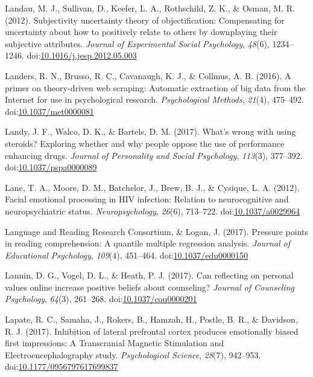 \documentclass[english,man]{apa6}
\theoremstyle{definition}
\theoremstyle{definition}
\theoremstyle{definition}
\theoremstyle{remark}
\begin{document}
\hypertarget{ref-Landau2012}{}
Landau, M. J., Sullivan, D., Keefer, L. A., Rothschild, Z. K., \& Osman,
M. R. (2012). Subjectivity uncertainty theory of objectification:
Compensating for uncertainty about how to positively relate to others by
downplaying their subjective attributes. \emph{Journal of Experimental
Social Psychology}, \emph{48}(6), 1234--1246.
doi:\href{https://doi.org/10.1016/j.jesp.2012.05.003}{10.1016/j.jesp.2012.05.003}

\hypertarget{ref-Landers2016}{}
Landers, R. N., Brusso, R. C., Cavanaugh, K. J., \& Collmus, A. B.
(2016). A primer on theory-driven web scraping: Automatic extraction of
big data from the Internet for use in psychological research.
\emph{Psychological Methods}, \emph{21}(4), 475--492.
doi:\href{https://doi.org/10.1037/met0000081}{10.1037/met0000081}

\hypertarget{ref-Landy2017}{}
Landy, J. F., Walco, D. K., \& Bartels, D. M. (2017). What's wrong with
using steroids? Exploring whether and why people oppose the use of
performance enhancing drugs. \emph{Journal of Personality and Social
Psychology}, \emph{113}(3), 377--392.
doi:\href{https://doi.org/10.1037/pspa0000089}{10.1037/pspa0000089}

\hypertarget{ref-Lane2012}{}
Lane, T. A., Moore, D. M., Batchelor, J., Brew, B. J., \& Cysique, L. A.
(2012). Facial emotional processing in HIV infection: Relation to
neurocognitive and neuropsychiatric status. \emph{Neuropsychology},
\emph{26}(6), 713--722.
doi:\href{https://doi.org/10.1037/a0029964}{10.1037/a0029964}

\hypertarget{ref-LanguageandReadingResearchConsortium2017}{}
Language and Reading Research Consortium, \& Logan, J. (2017). Pressure
points in reading comprehension: A quantile multiple regression
analysis. \emph{Journal of Educational Psychology}, \emph{109}(4),
451--464.
doi:\href{https://doi.org/10.1037/edu0000150}{10.1037/edu0000150}

\hypertarget{ref-Lannin2017}{}
Lannin, D. G., Vogel, D. L., \& Heath, P. J. (2017). Can reflecting on
personal values online increase positive beliefs about counseling?
\emph{Journal of Counseling Psychology}, \emph{64}(3), 261--268.
doi:\href{https://doi.org/10.1037/cou0000201}{10.1037/cou0000201}

\hypertarget{ref-Lapate2017}{}
Lapate, R. C., Samaha, J., Rokers, B., Hamzah, H., Postle, B. R., \&
Davidson, R. J. (2017). Inhibition of lateral prefrontal cortex produces
emotionally biased first impressions: A Transcranial Magnetic
Stimulation and Electroencephalography study. \emph{Psychological
Science}, \emph{28}(7), 942--953.
doi:\href{https://doi.org/10.1177/0956797617699837}{10.1177/0956797617699837}
\end{document}
